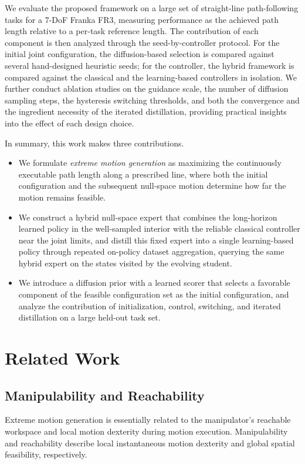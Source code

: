 \documentclass[journal, twoside]{IEEEtran}
\newcommand{\rev}[1]{\begingroup\color{magenta}#1\endgroup}
\newcommand{\rst}[1]{{\color{rstcolor}#1}}
\begin{document}
We evaluate the proposed framework on a large set of straight-line path-following tasks for a 7-DoF Franka FR3, measuring performance as the achieved path length relative to a per-task reference length. The contribution of each component is then analyzed through the seed-by-controller protocol. For the initial joint configuration, the diffusion-based selection is compared against several hand-designed heuristic seeds; for the controller, the hybrid framework is compared against the classical and the learning-based controllers in isolation. We further conduct ablation studies on the guidance scale, the number of diffusion sampling steps, \rev{the hysteresis switching thresholds, and both the convergence and the ingredient necessity of the iterated distillation}, providing practical insights into the effect of each design choice.

\rst{In summary, this work makes three contributions.
\begin{itemize}
\item We formulate \emph{extreme motion generation} as maximizing the continuously executable path length along a prescribed line, where both the initial configuration and the subsequent null-space motion determine how far the motion remains feasible.
\item We construct a hybrid null-space expert that combines the long-horizon learned policy in the well-sampled interior with the reliable classical controller near the joint limits, and \rst{distill this fixed expert into a single learning-based policy through repeated on-policy dataset aggregation, querying the same hybrid expert on the states visited by the evolving student}.
\item We introduce a diffusion prior with a learned scorer that selects a favorable \rst{component of the feasible configuration set} as the initial configuration, and analyze the contribution of initialization, control, switching, and \rst{iterated distillation} on a large held-out task set.
\end{itemize}}

\section{Related Work}

\subsection{Manipulability and Reachability}
Extreme motion generation is essentially related to the manipulator's reachable workspace and local motion dexterity during motion execution. Manipulability and reachability describe local instantaneous motion dexterity and global spatial feasibility, respectively.
\end{document}
